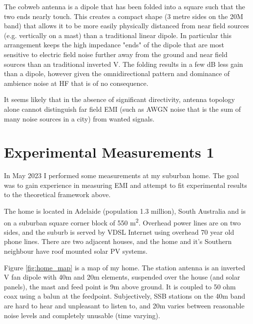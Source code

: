 \documentclass{article}
\begin{document}
The cobweb antenna is a dipole that has been folded into a square such that the two ends nearly touch.  This creates a compact shape (3 metre sides on the 20M band) that allows it to be more easily physically distanced from near field sources (e.g. vertically on a mast) than a traditional linear dipole.  In particular this arrangement keeps the high impedance "ends" of the dipole that are most sensitive to electric field noise further away from the ground and near field sources than an traditional inverted V. The folding results in a few dB less gain than a dipole, however given the omnidirectional pattern and dominance of ambience noise at HF that is of no consequence.

It seems likely that in the absence of significant directivity, antenna topology alone cannot distinguish far field EMI (such as AWGN noise that is the sum of many noise sources in a city) from wanted signals.

\section{Experimental Measurements 1}

In May 2023 I performed some measurements at my suburban home.  The goal was to gain experience in measuring EMI and attempt to fit experimental results to the theoretical framework above.

The home is located in Adelaide (population 1.3 million), South Australia and is on a suburban square corner block of 550 \si{\metre\squared}.  Overhead power lines are on two sides, and the suburb is served by VDSL Internet using overhead 70 year old phone lines.  There are two adjacent houses, and the home and it's Southern neighbour have roof mounted solar PV systems.

Figure \ref{fig:home_map} is a map of my home. The station antenna is an inverted V fan dipole with 40m and 20m elements, suspended over the house (and solar panels), the mast and feed point is 9m above ground. It is coupled to 50 ohm coax using a balun at the feedpoint. Subjectively, SSB stations on the 40m band are hard to hear and unpleasant to listen to, and 20m varies between reasonable noise levels and completely unusable (time varying).
\end{document}

